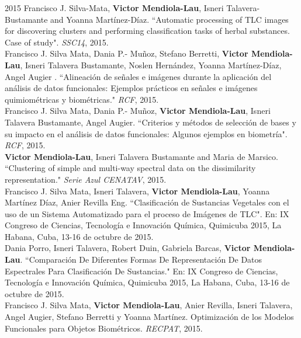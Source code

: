 \documentclass[]{friggeri-cv}
\begin{document}
\begin{entrylist}    
  \entry
    {2015}
    {}
    {}
    {
		Francisco J. Silva-Mata, \textbf{Victor Mendiola-Lau}, Isneri Talavera-Bustamante and Yoanna Martínez-Díaz. ``Automatic processing of TLC images for discovering clusters and performing classification tasks of herbal substances. Case of study". \emph{SSC14}, 2015.\\
	
		Francisco J. Silva Mata, Dania P.- Muñoz, Stefano Berretti, \textbf{Victor Mendiola-Lau}, Isneri Talavera Bustamante, Noslen Hernández, Yoanna Martínez-Díaz, Angel Augier . ``Alineación de señales e imágenes durante la aplicación del análisis de datos funcionales: Ejemplos prácticos en señales e imágenes quimiométricas y biométricas."  \emph{RCF}, 2015.\\
	
		Francisco J. Silva Mata, Dania P.- Muñoz, \textbf{Victor Mendiola-Lau}, Isneri Talavera Bustamante, Angel Augier. ``Criterios y métodos de selección de bases y su impacto en el análisis de datos funcionales: Algunos ejemplos en biometría". \emph{RCF}, 2015.\\
	
		\textbf{Victor Mendiola-Lau}, Isneri Talavera Bustamante and Maria de Marsico. ``Clustering of simple and multi-way spectral data on the dissimilarity representation." \emph{Serie Azul CENATAV}, 2015.\\
	
		Francisco J. Silva Mata,  Isneri Talavera, \textbf{Victor Mendiola-Lau}, Yoanna Martínez Díaz, Anier Revilla Eng. ``Clasificación de Sustancias Vegetales con el uso de un Sistema Automatizado para el proceso de Imágenes de TLC". En: IX Congreso de Ciencias, Tecnología e Innovación Química, Quimicuba 2015, La Habana, Cuba, 13-16 de octubre de 2015.\\
	
		Dania Porro, Isneri Talavera, Robert Duin, Gabriela Barcas, \textbf{Victor Mendiola-Lau}. ``Comparación De Diferentes Formas De Representación De Datos Espectrales Para Clasificación De Sustancias." En: IX Congreso de Ciencias, Tecnología e Innovación Química, Quimicuba 2015, La Habana, Cuba, 13-16 de octubre de 2015.\\
	
		Francisco J. Silva Mata, \textbf{Victor Mendiola-Lau}, Anier Revilla, Isneri Talavera, Angel Augier, Stefano Berretti y Yoanna Martínez. Optimización de los Modelos Funcionales para Objetos Biométricos. \emph{RECPAT}, 2015.   
    }    
\end{entrylist}
\end{document}
